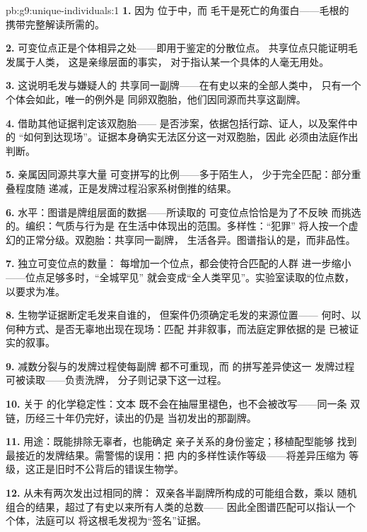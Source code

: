 \begin{solution}{pb:g9:unique-individuals:1}
\textbf{1.} 因为  位于中，而
毛干是死亡的角蛋白——毛根的
携带完整解读所需的。

\textbf{2.} 可变位点正是个体相异之处——即用于鉴定的分散位点。
共享位点只能证明毛发属于人类，
这是亲缘层面的事实，
对于指认某一个具体的人毫无用处。

\textbf{3.} 这说明毛发与嫌疑人的
共享同一副牌——在有史以来的全部人类中，
只有一个个体会如此，唯一的例外是
同卵双胞胎，他们因同源而共享这副牌。

\textbf{4.} 借助其他证据判定该双胞胎——
是否涉案，依据包括行踪、证人，以及案件中的
“如何到达现场”。证据本身确实无法区分这一对双胞胎，因此
必须由法庭作出判断。

\textbf{5.} 亲属因同源共享大量
可变拼写的比例——多于陌生人，
少于完全匹配：部分重叠程度随
递减，正是发牌过程沿家系树倒推的结果。

\textbf{6.} 水平：图谱是牌组层面的数据——所读取的
可变位点恰恰是为了不反映
而挑选的。编织：气质与行为是
在生活中体现出的范围。多样性：“犯罪”
将人按一个虚幻的正常分级。双胞胎：共享同一副牌，
生活各异。图谱指认的是，而非品性。

\textbf{7.} 独立可变位点的数量：
每增加一个位点，都会使符合匹配的人群
进一步缩小——位点足够多时，“全城罕见”
就会变成“全人类罕见”。实验室读取的位点数，
以要求为准。

\textbf{8.} 生物学证据断定毛发来自谁的，
但案件仍须确定毛发的来源位置——
何时、以何种方式、是否无辜地出现在现场：匹配
并非叙事，而法庭定罪依据的是
已被证实的叙事。

\textbf{9.} 减数分裂与的发牌过程使每副牌
都不可重现，而  的拼写差异使这一
发牌过程可被读取——负责洗牌，
分子则记录下这一过程。

\textbf{10.} 关于  的化学稳定性：文本
既不会在抽屉里褪色，也不会被改写——同一条
双链，历经三十年仍完好，读出的仍是
当初发出的那副牌。

\textbf{11.} 用途：既能排除无辜者，也能确定
亲子关系的身份鉴定；移植配型能够
找到最接近的发牌结果。需警惕的误用：把
内的多样性读作等级——将差异压缩为
等级，这正是旧时不公背后的错误生物学。

\textbf{12.} 从未有两次发出过相同的牌：
双亲各半副牌所构成的可能组合数，乘以
随机组合的结果，超过了有史以来所有人类的总数——
因此全图谱匹配可以指认一个个体，法庭可以
将这根毛发视为“签名”证据。
\end{solution}
